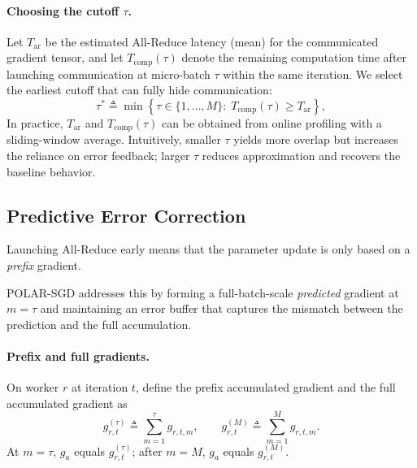 \paragraph{Choosing the cutoff $\tau$.}
Let $T_{\mathrm{ar}}$ be the estimated All-Reduce latency (mean) for the communicated gradient tensor, and let $T_{\mathrm{comp}}(\tau)$ denote the remaining computation time after launching communication at micro-batch $\tau$ within the same iteration. We select the earliest cutoff that can fully hide communication:
\begin{equation}
\tau^* \triangleq \min \left\{\tau \in \{1,\ldots,M\}:\; T_{\mathrm{comp}}(\tau) \ge T_{\mathrm{ar}}\right\},
\label{eq:tau_rule}
\end{equation}
In practice, $T_{\mathrm{ar}}$ and $T_{\mathrm{comp}}(\tau)$ can be obtained from online profiling with a sliding-window average. Intuitively, smaller $\tau$ yields more overlap but increases the reliance on error feedback; larger $\tau$ reduces approximation and recovers the baseline behavior.

\subsection{Predictive Error Correction}

Launching All-Reduce early means that the parameter update is only based on a \emph{prefix} gradient.

POLAR-SGD addresses this by forming a full-batch-scale \emph{predicted} gradient at $m=\tau$ and maintaining an error buffer that captures the mismatch between the prediction and the full accumulation.

\paragraph{Prefix and full gradients.}
On worker $r$ at iteration $t$, define the prefix accumulated gradient and the full accumulated gradient as
\begin{equation}
g_{r,t}^{(\tau)} \triangleq \sum_{m=1}^{\tau} g_{r,t,m},
\qquad
g_{r,t}^{(M)} \triangleq \sum_{m=1}^{M} g_{r,t,m}.
\end{equation}
At $m=\tau$, $g_a$ equals $g_{r,t}^{(\tau)}$; after $m=M$, $g_a$ equals $g_{r,t}^{(M)}$.

